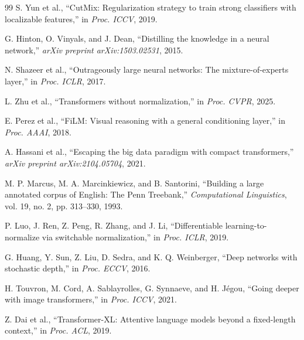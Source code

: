 \documentclass[conference]{IEEEtran}
\begin{document}
\begin{thebibliography}{99}
S. Yun et al., ``CutMix: Regularization strategy to train strong
classifiers with localizable features,'' in \textit{Proc. ICCV}, 2019.

G. Hinton, O. Vinyals, and J. Dean, ``Distilling the knowledge in a
neural network,'' \textit{arXiv preprint arXiv:1503.02531}, 2015.

N. Shazeer et al., ``Outrageously large neural networks: The
mixture-of-experts layer,'' in \textit{Proc. ICLR}, 2017.

L. Zhu et al., ``Transformers without normalization,'' in
\textit{Proc. CVPR}, 2025.

E. Perez et al., ``FiLM: Visual reasoning with a general conditioning
layer,'' in \textit{Proc. AAAI}, 2018.

A. Hassani et al., ``Escaping the big data paradigm with compact
transformers,'' \textit{arXiv preprint arXiv:2104.05704}, 2021.

M. P. Marcus, M. A. Marcinkiewicz, and B. Santorini, ``Building a
large annotated corpus of English: The Penn Treebank,''
\textit{Computational Linguistics}, vol. 19, no. 2, pp. 313--330,
1993.

P. Luo, J. Ren, Z. Peng, R. Zhang, and J. Li, ``Differentiable
learning-to-normalize via switchable normalization,'' in \textit{Proc.
ICLR}, 2019.

G. Huang, Y. Sun, Z. Liu, D. Sedra, and K. Q. Weinberger, ``Deep
networks with stochastic depth,'' in \textit{Proc. ECCV}, 2016.

H. Touvron, M. Cord, A. Sablayrolles, G. Synnaeve, and H. J{\'e}gou,
``Going deeper with image transformers,'' in \textit{Proc. ICCV}, 2021.

Z. Dai et al., ``Transformer-XL: Attentive language models beyond a
fixed-length context,'' in \textit{Proc. ACL}, 2019.

\end{thebibliography}
\end{document}
